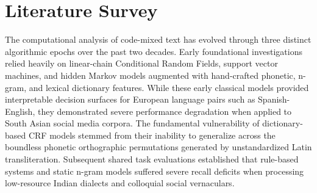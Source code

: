 \documentclass[10pt,twocolumn,letterpaper]{article}
\theoremstyle{definition}
\begin{document}
\section{Literature Survey}
The computational analysis of code-mixed text has evolved through three distinct algorithmic epochs over the past two decades. Early foundational investigations relied heavily on linear-chain Conditional Random Fields, support vector machines, and hidden Markov models augmented with hand-crafted phonetic, n-gram, and lexical dictionary features. While these early classical models provided interpretable decision surfaces for European language pairs such as Spanish-English, they demonstrated severe performance degradation when applied to South Asian social media corpora. The fundamental vulnerability of dictionary-based CRF models stemmed from their inability to generalize across the boundless phonetic orthographic permutations generated by unstandardized Latin transliteration. Subsequent shared task evaluations established that rule-based systems and static n-gram models suffered severe recall deficits when processing low-resource Indian dialects and colloquial social vernaculars.
\end{document}
